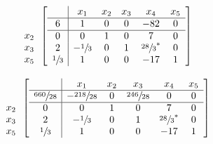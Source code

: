 \documentclass[12pt]{article}
\newenvironment{problem}[2][Problem]{\begin{trivlist}
\item[\hskip \labelsep {\bfseries #1}\hskip \labelsep {\bfseries #2.}]}{\end{trivlist}}
\theoremstyle{definition}
\begin{document}
\begin{problem}{4}
\begin{equation}
\begin{array}{c}
\\
  \\
x_2 \\
x_3 \\
x_5
\end{array}
\begin{bmatrix}
\begin{array}{c|ccccc}
    & x_1 & x_2 & x_3 & x_4 & x_5 \\ \hline
  6 & 1 & 0 & 0 & -82 & 0 \\ \hline
  0 & 0 & 1 & 0 & 7 & 0  \\
  2 & -\sfrac{1}{3} & 0 & 1 & \sfrac{28}{3}^* & 0  \\
  \sfrac{1}{3} & 1 & 0 & 0 & -17 & 1  \\
\end{array}
\end{bmatrix}
\end{equation}
$ $ \\

\begin{equation}
\begin{array}{c}
\\
  \\
x_2 \\
x_3 \\
x_5
\end{array}
\begin{bmatrix} %
\begin{array}{c|ccccc}
    & x_1 & x_2 & x_3 & x_4 & x_5 \\ \hline
  \sfrac{660}{28} & -\sfrac{218}{28} & 0 & \sfrac{246}{28} & 0 & 0 \\ \hline
  0 & 0 & 1 & 0 & 7 & 0  \\
  2 & -\sfrac{1}{3} & 0 & 1 & \sfrac{28}{3}^* & 0  \\
  \sfrac{1}{3} & 1 & 0 & 0 & -17 & 1  \\
\end{array}
\end{bmatrix}
\end{equation}

\end{problem}
\end{document}
